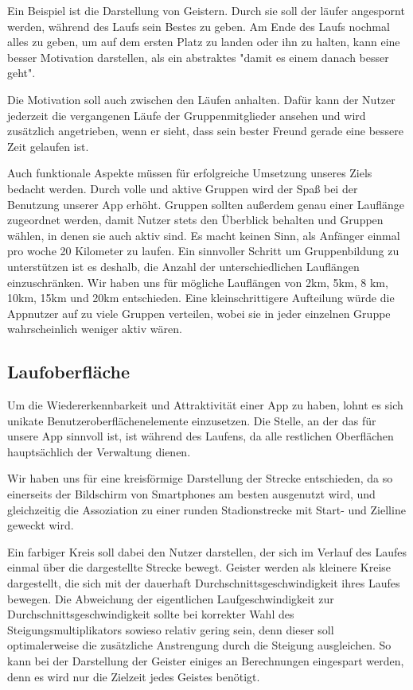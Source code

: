 Ein Beispiel ist die Darstellung von Geistern. Durch sie soll der läufer angespornt werden, während des Laufs sein Bestes zu geben. Am Ende des Laufs nochmal alles zu geben, um auf dem ersten Platz zu landen oder ihn zu halten, kann eine besser Motivation darstellen, als ein abstraktes "damit es einem danach besser geht".

Die Motivation soll auch zwischen den Läufen anhalten. Dafür kann der Nutzer jederzeit die vergangenen Läufe der Gruppenmitglieder ansehen und wird zusätzlich angetrieben, wenn er sieht, dass sein bester Freund gerade eine bessere Zeit gelaufen ist.

Auch funktionale Aspekte müssen für erfolgreiche Umsetzung unseres Ziels bedacht werden. Durch volle und aktive Gruppen wird der Spaß bei der Benutzung unserer App erhöht. Gruppen sollten außerdem genau einer Lauflänge zugeordnet werden, damit Nutzer stets den Überblick behalten und Gruppen wählen, in denen sie auch aktiv sind. Es macht keinen Sinn, als Anfänger einmal pro woche 20 Kilometer zu laufen. Ein sinnvoller Schritt um Gruppenbildung zu unterstützen ist es deshalb, die Anzahl der unterschiedlichen Lauflängen einzuschränken. Wir haben uns für mögliche Lauflängen von 2km, 5km, 8 km, 10km, 15km und 20km entschieden. Eine kleinschrittigere Aufteilung würde die Appnutzer auf zu viele Gruppen verteilen, wobei sie in jeder einzelnen Gruppe wahrscheinlich weniger aktiv wären.
\subsection{Laufoberfläche}
Um die Wiedererkennbarkeit und Attraktivität einer App zu haben, lohnt es sich unikate Benutzeroberflächenelemente einzusetzen. Die Stelle, an der das für unsere App sinnvoll ist, ist während des Laufens, da alle restlichen Oberflächen hauptsächlich der Verwaltung dienen.

Wir haben uns für eine kreisförmige Darstellung der Strecke entschieden, da so einerseits der Bildschirm von Smartphones am besten ausgenutzt wird, und gleichzeitig die Assoziation zu einer runden Stadionstrecke mit Start- und Zielline geweckt wird.

Ein farbiger Kreis soll dabei den Nutzer darstellen, der sich im Verlauf des Laufes einmal über die dargestellte Strecke bewegt. Geister werden als kleinere Kreise dargestellt, die sich mit der dauerhaft Durchschnittsgeschwindigkeit ihres Laufes bewegen. Die Abweichung der eigentlichen Laufgeschwindigkeit zur Durchschnittsgeschwindigkeit sollte bei korrekter Wahl des Steigungsmultiplikators sowieso relativ gering sein, denn dieser soll optimalerweise die zusätzliche Anstrengung durch die Steigung ausgleichen. So kann bei der Darstellung der Geister einiges an Berechnungen eingespart werden, denn es wird nur die Zielzeit jedes Geistes benötigt.

